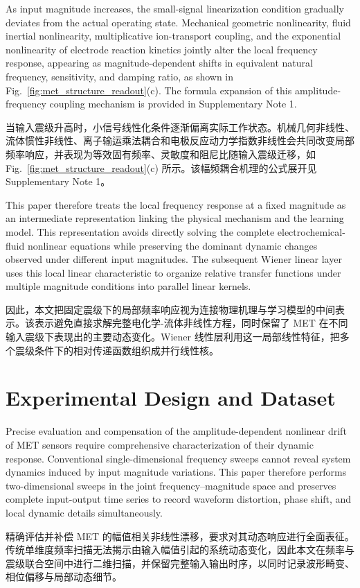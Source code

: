 \documentclass[sn-nature]{sn-jnl}
\newif\ifCNENEnglish
\newif\ifCNENBilingual
\newcommand{\CNEN}[2]{%
    \ifCNENBilingual
        #1%
        \if\relax\detokenize{#2}\relax\else\par #2\fi%
    \else
        \ifCNENEnglish
            #2%
        \else
            #1%
        \fi
    \fi
}
\begin{document}
\CNEN{当输入震级升高时，小信号线性化条件逐渐偏离实际工作状态。机械几何非线性、流体惯性非线性、离子输运乘法耦合和电极反应动力学指数非线性会共同改变局部频率响应，并表现为等效固有频率、灵敏度和阻尼比随输入震级迁移，如 Fig.~\ref{fig:met_structure_readout}(c) 所示。该幅频耦合机理的公式展开见 Supplementary Note 1。}{As input magnitude increases, the small-signal linearization condition gradually deviates from the actual operating state. Mechanical geometric nonlinearity, fluid inertial nonlinearity, multiplicative ion-transport coupling, and the exponential nonlinearity of electrode reaction kinetics jointly alter the local frequency response, appearing as magnitude-dependent shifts in equivalent natural frequency, sensitivity, and damping ratio, as shown in Fig.~\ref{fig:met_structure_readout}(c). The formula expansion of this amplitude-frequency coupling mechanism is provided in Supplementary Note 1.%
}

\CNEN{因此，本文把固定震级下的局部频率响应视为连接物理机理与学习模型的中间表示。该表示避免直接求解完整电化学-流体非线性方程，同时保留了 MET 在不同输入震级下表现出的主要动态变化。Wiener 线性层利用这一局部线性特征，把多个震级条件下的相对传递函数组织成并行线性核。}{This paper therefore treats the local frequency response at a fixed magnitude as an intermediate representation linking the physical mechanism and the learning model. This representation avoids directly solving the complete electrochemical-fluid nonlinear equations while preserving the dominant dynamic changes observed under different input magnitudes. The subsequent Wiener linear layer uses this local linear characteristic to organize relative transfer functions under multiple magnitude conditions into parallel linear kernels.}



\section{Experimental Design and Dataset}

\CNEN{精确评估并补偿 MET 的幅值相关非线性漂移，要求对其动态响应进行全面表征。传统单维度频率扫描\cite{WOS:000492361300009}无法揭示由输入幅值引起的系统动态变化，因此本文在频率与震级联合空间中进行二维扫描，并保留完整输入输出时序，以同时记录波形畸变、相位偏移与局部动态细节。}{Precise evaluation and compensation of the amplitude-dependent nonlinear drift of MET sensors require comprehensive characterization of their dynamic response. Conventional single-dimensional frequency sweeps \cite{WOS:000492361300009} cannot reveal system dynamics induced by input magnitude variations. This paper therefore performs two-dimensional sweeps in the joint frequency--magnitude space and preserves complete input-output time series to record waveform distortion, phase shift, and local dynamic details simultaneously.%
}
\end{document}

